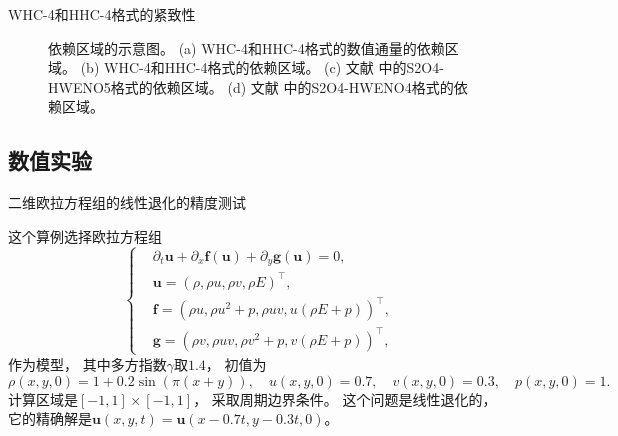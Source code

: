 \documentclass[aspectratio=169]{beamer}
\begin{document}
\begin{frame}{WHC-4和HHC-4格式的紧致性}
  
  \begin{figure}[htbp]
    \centering
    \caption{
      依赖区域的示意图。
      (a) WHC-4和HHC-4格式的数值通量的依赖区域。
      (b) WHC-4和HHC-4格式的依赖区域。
      (c) 文献 \citep{du2018hermite} 中的S2O4-HWENO5格式的依赖区域。
      (d) 文献 \citep{Qiu-Shu-2005} 中的S2O4-HWENO4格式的依赖区域。
    }
  \end{figure}
  
\end{frame}

\subsection{数值实验}

\begin{frame}{二维欧拉方程组的线性退化的精度测试}
  
  \begin{example}[二维欧拉方程组的线性退化的精度测试]
    \label{ex:2D-acc2}
    这个算例选择欧拉方程组
    \begin{equation*}
      \label{eq:2D-Euler}
      \left\{
      \begin{aligned}
         & {\partial_{t}}{\bm{u}}+{\partial_{x}}{\bm{f}}({\bm{u}})+{\partial_{y}}{\bm{g}}({\bm{u}})=0, \\
         & {\bm{u}}=(\rho, \rho u, \rho v, \rho E)^\top,                                               \\
         & {\bm{f}}=(\rho u, \rho u^2+p, \rho uv, u (\rho E+p))^\top,                                  \\
         & {\bm{g}}=(\rho v, \rho uv, \rho v^2+p, v (\rho E+p))^\top,
      \end{aligned}
      \right.
    \end{equation*}
    作为模型，
    其中多方指数$\gamma$取$1.4$，
    初值为
    \begin{equation*}
      \rho(x,y,0) = 1 + 0.2\sin(\pi(x+y)), \quad u(x,y,0)=0.7, \quad v(x,y,0)=0.3, \quad p(x,y,0)=1.
    \end{equation*}
    计算区域是$[-1,1]\times[-1,1]$，
    采取周期边界条件。
    这个问题是线性退化的，
    它的精确解是${\bm{u}}(x,y,t) = {\bm{u}}(x-0.7t,y-0.3t,0)$。
  \end{example}
  
\end{frame}
\end{document}
